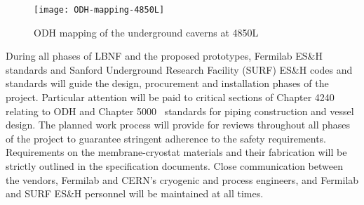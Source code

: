 \begin{figure}[htbp]
\centering
\texttt{[image: ODH-mapping-4850L]}
\caption{ODH mapping of the underground caverns at 4850L} 
\label{fig:ODH-mapping-4850L}
\end{figure}

During all phases of LBNF and the proposed prototypes, 
Fermilab ES\&H standards and Sanford Underground Research 
Facility (SURF) ES\&H codes and standards will guide the design, 
procurement and installation phases of the project. Particular 
attention will be paid to critical sections of
Chapter 4240~\cite{feshm} relating to ODH and 
Chapter 5000~\cite{feshm} standards for 
piping construction and vessel design. The planned 
work process will provide for reviews throughout all 
phases of the project to guarantee stringent adherence 
to the safety requirements. Requirements on the membrane-cryostat
materials and their fabrication will be strictly outlined in the 
specification documents. Close communication between the vendors, 
Fermilab and CERN's cryogenic and process engineers, and Fermilab and 
SURF ES\&H personnel will be maintained at all times.

